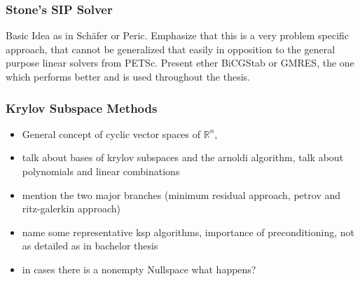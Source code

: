        \subsubsection{Stone's SIP Solver}

         Basic Idea as in Schäfer or Peric. Emphasize that this is a very problem specific approach, that cannot be generalized that easily in opposition to the general purpose linear solvers from PETSc. Present ether BiCGStab or GMRES, the one which performs better and is used throughout the thesis.

       \subsubsection{Krylov Subspace Methods}
        \begin{itemize}
          \item General concept of cyclic vector spaces of \(\mathbb{R}^n\), 
          \item talk about bases of krylov subspaces and the arnoldi algorithm, talk about polynomials and linear combinations
          \item mention the two major branches (minimum residual approach, petrov and ritz-galerkin approach) 
          \item name some representative ksp algorithms, importance of preconditioning, not as detailed as in bachelor thesis
          \item in cases there is a nonempty Nullspace what happens?
        \end{itemize}

